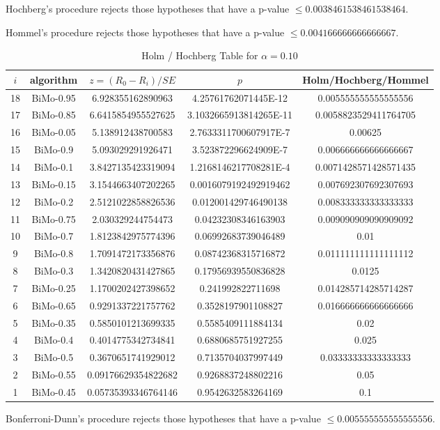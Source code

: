 \documentclass[a4paper,10pt]{article}
\begin{document}
\begin{landscape}
Hochberg's procedure rejects those hypotheses that have a p-value $\le0.0038461538461538464$.


Hommel's procedure rejects those hypotheses that have a p-value $\le0.004166666666666667$.


\begin{table}[!htp]
\centering\tiny
\caption{Holm / Hochberg Table for $\alpha=0.10$}
\begin{tabular}{ccccc}
$i$&algorithm&$z=(R_0 - R_i)/SE$&$p$&Holm/Hochberg/Hommel\\
\hline
18&BiMo-0.95&6.928355162890963&4.25761762071445E-12&0.005555555555555556\\
17&BiMo-0.85&6.6415854955527625&3.1032665913814265E-11&0.0058823529411764705\\
16&BiMo-0.05&5.138912438700583&2.7633311700607917E-7&0.00625\\
15&BiMo-0.9&5.093029291926471&3.523872296624909E-7&0.006666666666666667\\
14&BiMo-0.1&3.8427135423319094&1.2168146217708281E-4&0.0071428571428571435\\
13&BiMo-0.15&3.1544663407202265&0.0016079192492919462&0.007692307692307693\\
12&BiMo-0.2&2.5121022858826536&0.012001429746490138&0.008333333333333333\\
11&BiMo-0.75&2.030329244754473&0.04232308346163903&0.009090909090909092\\
10&BiMo-0.7&1.8123842975774396&0.06992683739046489&0.01\\
9&BiMo-0.8&1.7091472173356876&0.08742368315716872&0.011111111111111112\\
8&BiMo-0.3&1.3420820431427865&0.17956939550836828&0.0125\\
7&BiMo-0.25&1.1700202427398652&0.241992822711698&0.014285714285714287\\
6&BiMo-0.65&0.9291337221757762&0.3528197901108827&0.016666666666666666\\
5&BiMo-0.35&0.5850101213699335&0.5585409111884134&0.02\\
4&BiMo-0.4&0.4014775342734841&0.6880685751927255&0.025\\
3&BiMo-0.5&0.3670651741929012&0.7135704037997449&0.03333333333333333\\
2&BiMo-0.55&0.09176629354822682&0.9268837248802216&0.05\\
1&BiMo-0.45&0.05735393346764146&0.9542632583264169&0.1\\
\hline
\end{tabular}
\end{table}
Bonferroni-Dunn's procedure rejects those hypotheses that have a p-value $\le0.005555555555555556$.



\end{landscape}
\end{document}
